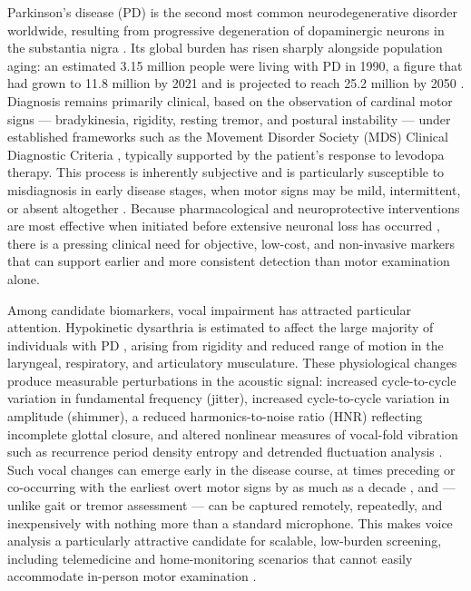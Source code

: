 Parkinson's disease (PD) is the second most common neurodegenerative
disorder worldwide, resulting from progressive degeneration of
dopaminergic neurons in the substantia nigra \cite{Kalia:2015}. Its global
burden has risen sharply alongside population aging: an estimated 3.15
million people were living with PD in 1990, a figure that had grown to
11.8 million by 2021 and is projected to reach 25.2 million by 2050
\cite{GBD2016PDCollaborators:2018,Luo:2025}. Diagnosis remains primarily
clinical, based on the observation of cardinal motor signs ---
bradykinesia, rigidity, resting tremor, and postural instability ---
under established frameworks such as the Movement Disorder Society (MDS)
Clinical Diagnostic Criteria \cite{Postuma:2015}, typically supported by
the patient's response to levodopa therapy. This process is inherently
subjective and is particularly susceptible to misdiagnosis in early
disease stages, when motor signs may be mild, intermittent, or absent
altogether \cite{Rizzo:2016}. Because pharmacological and neuroprotective
interventions are most effective when initiated before extensive
neuronal loss has occurred \cite{Frequin:2024}, there is a pressing
clinical need for objective, low-cost, and non-invasive markers that can
support earlier and more consistent detection than motor examination
alone.

Among candidate biomarkers, vocal impairment has attracted particular
attention. Hypokinetic dysarthria is estimated to affect the large
majority of individuals with PD \cite{Ho:1999,Cao:2025}, arising from
rigidity and reduced range of motion in the laryngeal, respiratory, and
articulatory musculature. These physiological changes produce measurable
perturbations in the acoustic signal: increased cycle-to-cycle variation
in fundamental frequency (jitter), increased cycle-to-cycle variation in
amplitude (shimmer), a reduced harmonics-to-noise ratio (HNR) reflecting
incomplete glottal closure, and altered nonlinear measures of vocal-fold
vibration such as recurrence period density entropy and detrended
fluctuation analysis \cite{Yang:2020}. Such vocal changes can emerge early
in the disease course, at times preceding or co-occurring with the
earliest overt motor signs by as much as a decade
\cite{Cao:2025,Rusz:2024}, and --- unlike gait or tremor assessment ---
can be captured remotely, repeatedly, and inexpensively with nothing more
than a standard microphone. This makes voice analysis a particularly
attractive candidate for scalable, low-burden screening, including
telemedicine and home-monitoring scenarios that cannot easily
accommodate in-person motor examination \cite{Rusz:2024}.

